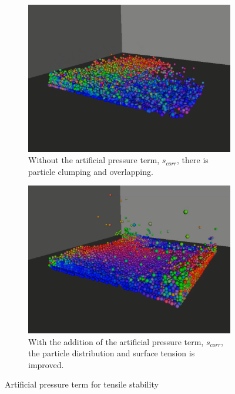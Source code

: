 \documentclass[conference]{IEEEtran}
\begin{document}
\begin{figure}[H]
\centering
\begin{subfigure}{0.475\textwidth}
  \centering
  \includegraphics[width=1.0\linewidth]{without_scorr.png}
  \caption{Without the artificial pressure term, $s_{corr}$, there is particle clumping and overlapping.}
  \label{fig:without_scorr}
\end{subfigure}
\begin{subfigure}{0.475\textwidth}
  \centering
  \includegraphics[width=1.0\linewidth]{with_scorr.png}
  \caption{With the addition of the artificial pressure term, $s_{corr}$, the particle distribution and surface tension is improved. }
  \label{fig:with_scorr}
\end{subfigure}
\caption{Artificial pressure term for tensile stability}
\label{fig:scorr}
\end{figure}
\end{document}
